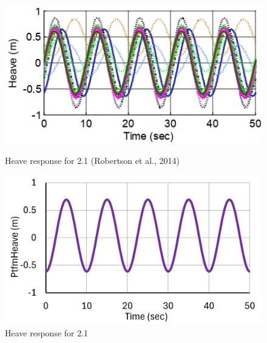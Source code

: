 \documentclass[a4paper]{article}
\begin{document}
\begin{figure}[H]
    \begin{minipage}{0.49\textwidth}
        \centering
        \includegraphics[width=1\textwidth]{2.1_heave.png}
        \caption{\small Heave response for 2.1 (Robertson et al., 2014)}
        \label{fig:2.1_heave}
    \end{minipage}
    \hfill
    \begin{minipage}{0.5\textwidth}
        \centering
        \vspace{-0.6cm}
        \includegraphics[width=1\textwidth]{2.1_heave_mine.png}
        \caption{\small Heave response for 2.1}
        \label{fig:2.1_heave_mine}
    \end{minipage}
\end{figure}
\end{document}

